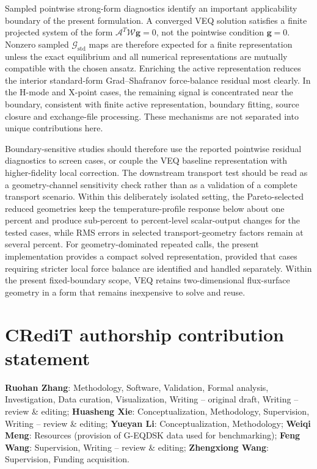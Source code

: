 \documentclass[final, 3p, times]{elsarticle}
\begin{document}
Sampled pointwise strong-form diagnostics identify an important applicability boundary of the present formulation. A converged VEQ solution satisfies a finite projected system of the form $\mathcal{A}^{T}\mathcal{W}\mathbf{g}=0$, not the pointwise condition $\mathbf{g}=0$. Nonzero sampled $\mathcal{G}_{\mathrm{std}}$ maps are therefore expected for a finite representation unless the exact equilibrium and all numerical representations are mutually compatible with the chosen ansatz. Enriching the active representation reduces the interior standard-form Grad--Shafranov force-balance residual most clearly. In the H-mode and X-point cases, the remaining signal is concentrated near the boundary, consistent with finite active representation, boundary fitting, source closure and exchange-file processing. These mechanisms are not separated into unique contributions here.

Boundary-sensitive studies should therefore use the reported pointwise residual diagnostics to screen cases, or couple the VEQ baseline representation with higher-fidelity local correction. The downstream transport test should be read as a geometry-channel sensitivity check rather than as a validation of a complete transport scenario. Within this deliberately isolated setting, the Pareto-selected reduced geometries keep the temperature-profile response below about one percent and produce sub-percent to percent-level scalar-output changes for the tested cases, while RMS errors in selected transport-geometry factors remain at several percent. For geometry-dominated repeated calls, the present implementation provides a compact solved representation, provided that cases requiring stricter local force balance are identified and handled separately. Within the present fixed-boundary scope, VEQ retains two-dimensional flux-surface geometry in a form that remains inexpensive to solve and reuse.

\section*{CRediT authorship contribution statement}
\textbf{Ruohan Zhang}: Methodology, Software, Validation, Formal analysis, Investigation, Data curation, Visualization, Writing -- original draft, Writing -- review \& editing;
\textbf{Huasheng Xie}: Conceptualization, Methodology, Supervision, Writing -- review \& editing;
\textbf{Yueyan Li}: Conceptualization, Methodology;
\textbf{Weiqi Meng}: Resources (provision of G-EQDSK data used for benchmarking);
\textbf{Feng Wang}: Supervision, Writing -- review \& editing;
\textbf{Zhengxiong Wang}: Supervision, Funding acquisition.
\end{document}
